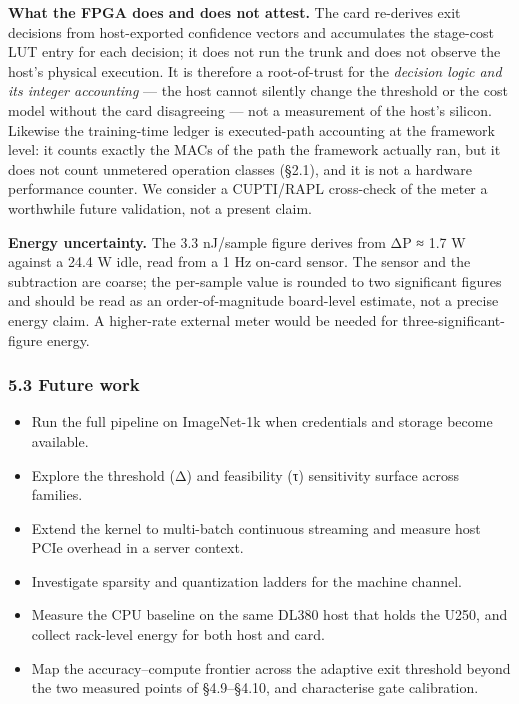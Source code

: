 \documentclass[
]{article}
\providecommand{\tightlist}{%
  \setlength{\itemsep}{0pt}\setlength{\parskip}{0pt}}
\begin{document}
\textbf{What the FPGA does and does not attest.} The card re-derives
exit decisions from host-exported confidence vectors and accumulates the
stage-cost LUT entry for each decision; it does not run the trunk and
does not observe the host's physical execution. It is therefore a
root-of-trust for the \emph{decision logic and its integer accounting}
--- the host cannot silently change the threshold or the cost model
without the card disagreeing --- not a measurement of the host's
silicon. Likewise the training-time ledger is executed-path accounting
at the framework level: it counts exactly the MACs of the path the
framework actually ran, but it does not count unmetered operation
classes (§2.1), and it is not a hardware performance counter. We
consider a CUPTI/RAPL cross-check of the meter a worthwhile future
validation, not a present claim.

\textbf{Energy uncertainty.} The 3.3 nJ/sample figure derives from ΔP ≈
1.7 W against a 24.4 W idle, read from a 1 Hz on-card sensor. The sensor
and the subtraction are coarse; the per-sample value is rounded to two
significant figures and should be read as an order-of-magnitude
board-level estimate, not a precise energy claim. A higher-rate external
meter would be needed for three-significant- figure energy.

\hypertarget{future-work}{%
\subsubsection{5.3 Future work}\label{future-work}}

\begin{itemize}
\tightlist
\item
  Run the full pipeline on ImageNet-1k when credentials and storage
  become available.
\item
  Explore the threshold (Δ) and feasibility (τ) sensitivity surface
  across families.
\item
  Extend the kernel to multi-batch continuous streaming and measure host
  PCIe overhead in a server context.
\item
  Investigate sparsity and quantization ladders for the machine channel.
\item
  Measure the CPU baseline on the same DL380 host that holds the U250,
  and collect rack-level energy for both host and card.
\item
  Map the accuracy--compute frontier across the adaptive exit threshold
  beyond the two measured points of §4.9--§4.10, and characterise gate
  calibration.
\end{itemize}
\end{document}
